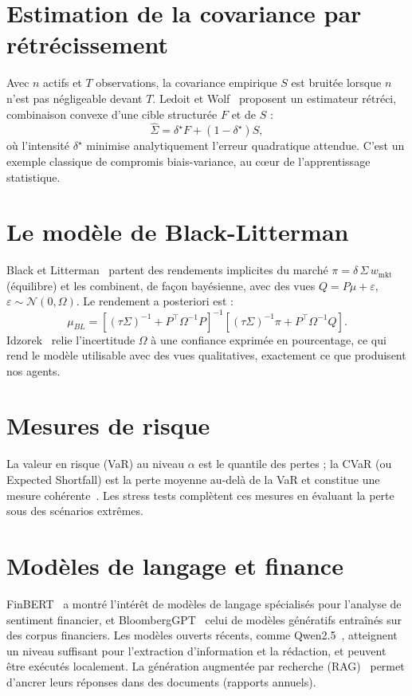 \documentclass[11pt,a4paper]{report}
\begin{document}
\section{Estimation de la covariance par rétrécissement}
Avec $n$ actifs et $T$ observations, la covariance empirique $S$ est bruitée lorsque $n$ n'est pas négligeable
devant $T$. Ledoit et Wolf~\cite{ledoitwolf} proposent un estimateur rétréci, combinaison convexe d'une cible
structurée $F$ et de $S$ :
\begin{equation}
  \hat\Sigma = \delta^\star F + (1-\delta^\star) S,
\end{equation}
où l'intensité $\delta^\star$ minimise analytiquement l'erreur quadratique attendue. C'est un exemple classique
de compromis biais-variance, au cœur de l'apprentissage statistique.

\section{Le modèle de Black-Litterman}
Black et Litterman~\cite{blacklitterman} partent des rendements implicites du marché
$\pi = \delta\,\Sigma\,w_{\text{mkt}}$ (équilibre) et les combinent, de façon bayésienne, avec des vues
$Q = P\mu + \varepsilon$, $\varepsilon\sim\mathcal{N}(0,\Omega)$. Le rendement a posteriori est :
\begin{equation}
  \mu_{BL} = \left[(\tau\Sigma)^{-1} + P^\top\Omega^{-1}P\right]^{-1}\left[(\tau\Sigma)^{-1}\pi + P^\top\Omega^{-1}Q\right].
\end{equation}
Idzorek~\cite{idzorek} relie l'incertitude $\Omega$ à une confiance exprimée en pourcentage, ce qui rend
le modèle utilisable avec des vues qualitatives, exactement ce que produisent nos agents.

\section{Mesures de risque}
La valeur en risque (VaR) au niveau $\alpha$ est le quantile des pertes ; la CVaR (ou Expected Shortfall) est la perte
moyenne au-delà de la VaR et constitue une mesure cohérente~\cite{cvar}. Les stress tests complètent ces mesures
en évaluant la perte sous des scénarios extrêmes.

\section{Modèles de langage et finance}
FinBERT~\cite{finbert} a montré l'intérêt de modèles de langage spécialisés pour l'analyse de sentiment financier,
et BloombergGPT~\cite{bloomberggpt} celui de modèles génératifs entraînés sur des corpus financiers.
Les modèles ouverts récents, comme Qwen2.5~\cite{qwen}, atteignent un niveau suffisant pour l'extraction
d'information et la rédaction, et peuvent être exécutés localement. La génération augmentée par recherche
(RAG)~\cite{rag} permet d'ancrer leurs réponses dans des documents (rapports annuels).
\end{document}
